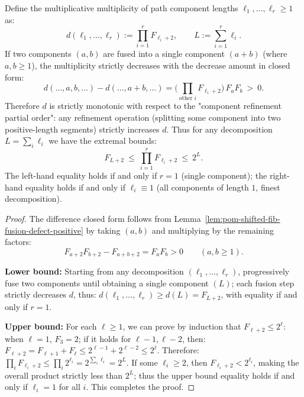 \begin{proposition}\label{prop:pom-path-component-multiplicity-refinement-monotone-extrema}
Define the multiplicative multiplicity of path component lengths $\ell_1,\dots,\ell_r\ge 1$ as:
\[
d(\ell_1,\dots,\ell_r):=\prod_{i=1}^r F_{\ell_i+2},
\qquad
L:=\sum_{i=1}^r \ell_i.
\]
If two components $(a,b)$ are fused into a single component $(a+b)$ (where $a,b\ge 1$), the multiplicity strictly decreases with the decrease amount in closed form:
\[
\boxed{\;
d(\ldots,a,b,\ldots)-d(\ldots,a+b,\ldots)
=\Big(\prod_{\text{other }i}F_{\ell_i+2}\Big)\,F_aF_b\ >\ 0.\;}
\]
Therefore $d$ is strictly monotonic with respect to the "component refinement partial order": any refinement operation (splitting some component into two positive-length segments) strictly increases $d$.
Thus for any decomposition $L=\sum_i\ell_i$ we have the extremal bounds:
\[
\boxed{\;
F_{L+2}\ \le\ \prod_{i=1}^r F_{\ell_i+2}\ \le\ 2^L.\;}
\]
The left-hand equality holds if and only if $r=1$ (single component); the right-hand equality holds if and only if $\ell_i\equiv 1$ (all components of length $1$, finest decomposition).
\end{proposition}
\begin{proof}
The difference closed form follows from Lemma~\ref{lem:pom-shifted-fib-fusion-defect-positive} by taking $(a,b)$ and multiplying by the remaining factors:
\[
F_{a+2}F_{b+2}-F_{a+b+2}=F_aF_b>0\qquad(a,b\ge 1).
\]
\par
\textbf{Lower bound:} Starting from any decomposition $(\ell_1,\dots,\ell_r)$, progressively fuse two components until obtaining a single component $(L)$;
each fusion step strictly decreases $d$, thus:
\(
d(\ell_1,\dots,\ell_r)\ge d(L)=F_{L+2}
\),
with equality if and only if $r=1$.
\par
\textbf{Upper bound:} For each $\ell\ge 1$, we can prove by induction that $F_{\ell+2}\le 2^\ell$: when $\ell=1$, $F_3=2$;
if it holds for $\ell-1,\ell-2$, then:
\(
F_{\ell+2}=F_{\ell+1}+F_\ell\le 2^{\ell-1}+2^{\ell-2}\le 2^\ell
\).
Therefore:
\(
\prod_i F_{\ell_i+2}\le \prod_i 2^{\ell_i}=2^{\sum_i\ell_i}=2^L
\).
If some $\ell_i\ge 2$, then $F_{\ell_i+2}<2^{\ell_i}$, making the overall product strictly less than $2^L$;
thus the upper bound equality holds if and only if $\ell_i=1$ for all $i$. This completes the proof.
\end{proof}

